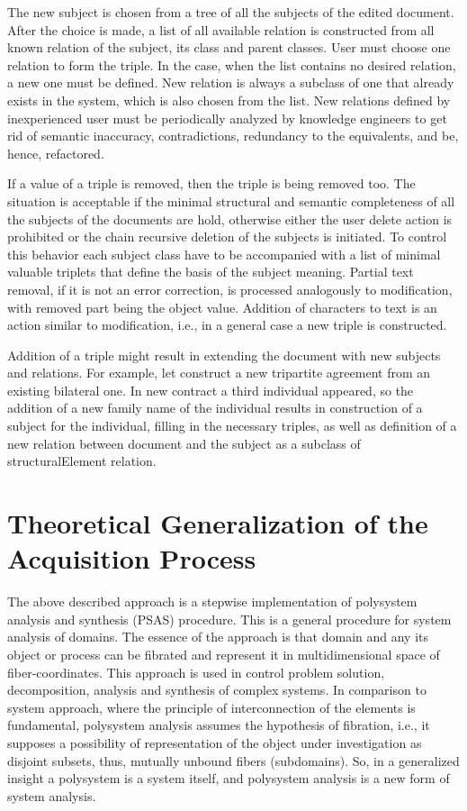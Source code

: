 \documentclass[utf8]{../IncArticle}
\begin{document}
The new subject is chosen from a tree of all the subjects of the edited document.  After the choice is made, a list of all available relation is constructed from all known relation of the subject, its class and parent classes.  User must choose one relation to form the triple.  In the case, when the list contains no desired relation, a new one must be defined.  New relation is always a subclass of one that already exists in the system, which is also chosen from the list.  New relations defined by inexperienced user must be periodically analyzed by knowledge engineers to get rid of semantic inaccuracy, contradictions, redundancy to the equivalents, and be, hence, refactored.

If a value of a triple is removed, then the triple is being removed too.  The situation is acceptable if the minimal structural and semantic completeness of all the subjects of the documents are hold, otherwise either the user delete action is prohibited or the chain recursive deletion of the subjects is initiated.  To control this behavior each subject class have to be accompanied with a list of minimal valuable triplets that define the basis of the subject meaning.  Partial text removal, if it is not an error correction, is processed analogously to modification, with removed part being the object value.  Addition of characters to text is an action similar to modification, i.e., in a general case a new triple is constructed.

Addition of a triple might result in extending the document with new subjects and relations.  For example, let construct a new tripartite agreement from an existing bilateral one.  In new contract a third individual appeared, so the addition of a new family name of the individual results in construction of a subject for the individual, filling in the necessary triples, as well as definition of a new relation between document and the subject as a subclass of structuralElement relation.

\section{Theoretical Generalization of the Acquisition Process}

The above described approach is a stepwise implementation of polysystem analysis and synthesis \cite{father} (PSAS) procedure.  This is a general procedure for system analysis of domains.  The essence of the approach is that domain and any its object or process can be fibrated and represent it in multidimensional space of fiber-coordinates.  This approach is used in control problem solution, decomposition, analysis and synthesis of complex systems.  In comparison to system approach, where the principle of interconnection of the elements is fundamental, polysystem analysis assumes the hypothesis of fibration, i.e., it supposes a possibility of representation of the object under investigation as disjoint subsets, thus, mutually unbound fibers (subdomains).  So, in a generalized insight a polysystem is a system itself, and polysystem analysis is a new form of system analysis.
\end{document}
